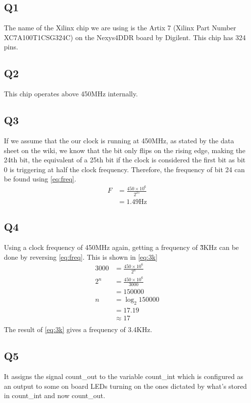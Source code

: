 \documentclass[a4paper, 12pt]{article}
\begin{document}
		\subsection{Q1}
			The name of the Xilinx chip we are using is the Artix 7 (Xilinx Part Number XC7A100T\-1CSG324C) on the Nexys4DDR board by Digilent. This chip has 324 pins.
		\subsection{Q2}
			This chip operates above 450MHz internally.
		\subsection{Q3}
			If we assume that the our clock is running at 450MHz, as stated by the data sheet on the wiki, we know that the bit only flips on the rising edge, making the 24th bit, the equivalent of a 25th bit if the clock is considered the first bit as bit 0 is triggering at half the clock frequency. Therefore, the frequency of bit 24 can be found using \cref{eq:freq}.
			\begin{equation}
				\label{eq:freq}
				\begin{split}
					F & = \frac{450\times 10^6}{2^{25}}\\
					  & = 1.49 \text{Hz}
				\end{split}
			\end{equation}
		\subsection{Q4}
			Using a clock frequency of 450MHz again, getting a frequency of \~3KHz can be done by reversing \cref{eq:freq}. This is shown in \cref{eq:3k}
			\begin{equation}
				\label{eq:3k}
				\begin{split}
					3000 & = \frac{450\times 10^6}{2^{n}}\\
					2^n  & = \frac{450\times 10^6}{3000}\\
						 & = 150000\\
					n    & = \log_{2}{150000}\\
						 & = 17.19\\
						 & \approx 17\\
				\end{split}
			\end{equation}
			The result of \cref{eq:3k} gives a frequency of 3.4KHz.
		\subsection{Q5}
			It assigns the signal count\_out to the variable count\_int which is configured as an output to some on board LEDs turning on the ones dictated by what's stored in count\_int and now count\_out.
\end{document}
